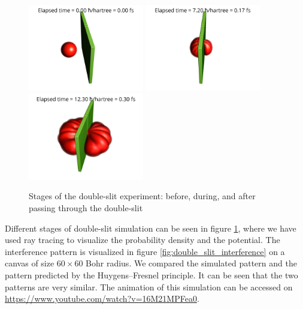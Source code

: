 \begin{figure}[hbt!]
	\begin{center}
		\includegraphics[width=0.45\textwidth]{figures/double_slit_01.png}
		\includegraphics[width=0.45\textwidth]{figures/double_slit_02.png}
		\includegraphics[width=0.45\textwidth]{figures/double_slit_03.png}
		\caption{Stages of the double-slit experiment: before, during, and after passing through the double-slit}
		\label{fig:double_slit_stages}
	\end{center}
\end{figure}
Different stages of double-slit simulation can be seen in figure \ref{fig:double_slit_stages}, where we have used ray tracing to visualize the probability density and the potential.
The interference pattern is visualized in figure \ref{fig:double_slit_interference} on a canvas of size $60 \times 60$ Bohr radius.
We compared the simulated pattern and the pattern predicted by the Huygens–Fresnel principle.
It can be seen that the two patterns are very similar.
The animation of this simulation can be accessed on \url{https://www.youtube.com/watch?v=16M21MPFea0}.
